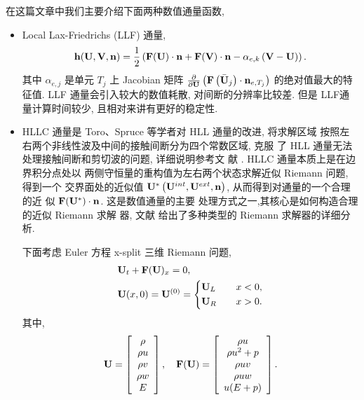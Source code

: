 在这篇文章中我们主要介绍下面两种数值通量函数,
\begin{itemize}
\item Local Lax-Friedrichs (LLF) 通量,
  \begin{equation}
    \label{eq:local-lax-friedrichs-flux}
    {\bf{h}}({\bf{U}},{\bf{V}},{\bf{n}}) = \frac{1}{2}
    \left(
      {\bf{F}}({\bf{U}}) \cdot {\bf{n}} + {\bf{F}}({\bf{V}})
      \cdot {\bf{n}} - \alpha_{e,k} \left( {\bf{V}} - {\bf{U}} \right)
    \right).
  \end{equation}
  其中 $\alpha_{e,j}$ 是单元 $T_{j}$ 上 Jacobian 矩阵 $\frac{\partial}{\partial
    {\bf{U}}} \left( {\bf{F}}\left( \bar{{\bf{U}}}_{j}
    \right)\cdot {\bf{n}}_{e,T_{j}} \right)$ 的绝对值最大的特征值.
  LLF 通量会引入较大的数值耗散, 对间断的分辨率比较差. 但是 LLF通
  量计算时间较少, 且相对来讲有更好的稳定性.
\item HLLC 通量是 Toro、Spruce 等学者对 HLL 通量的改进, 将求解区域
  按照左右两个非线性波及中间的接触间断分为四个常数区域, 克服
  了 HLL 通量无法处理接触间断和剪切波的问题, 详细说明参考文
  献 \cite{Toro1994,Harten1983b}. HLLC 通量本质上是在边界积分点处以
  两侧守恒量的重构值为左右两个状态求解近似 Riemann 问题, 得到一个
  交界面处的近似值 ${\bf{U}}^{*}\left( {\bf{U}}^{int},
    {\bf{U}}^{ext},{\bf{n}} \right)$, 从而得到对通量的一个合理的近
  似 ${\bf{F}}({\bf{U}}^{*})\cdot {\bf{n}}$. 这是数值通量的主要
  处理方式之一,其核心是如何构造合理的近似 Riemann 求解
  器, 文献 \cite{Toro2009} 给出了多种类型的 Riemann 求解器的详细分
  析.

  下面考虑 Euler 方程 x-split 三维 Riemann 问题,
  \begin{equation}
    \label{eq:x-split-3d-Riemann}
    \begin{aligned}
      &{\bf{U}}_{t}+{\bf{F}}({\bf{U}})_{x} = 0,\\
      &{\bf{U}}(x,0) = {\bf{U}}^{(0)} = \left\{
        \begin{aligned}
          &{\bf{U}}_{L} \quad & x < 0,\\
          &{\bf{U}}_{R} \quad & x > 0.
        \end{aligned}
      \right.
    \end{aligned}
  \end{equation}
  其中,
  \begin{equation}
    \label{eq:x-split-3d-Riemann-variable-and-flux}
    {\bf{U}} = \left[
      \begin{array}{c}
        \rho\\
        \rho u\\
        \rho v\\
        \rho w\\
        E
      \end{array}
    \right], \quad {\bf{F}}({\bf{U}}) = \left[
      \begin{array}{c}
        \rho u\\
        \rho u^{2} + p\\
        \rho u v\\
        \rho u w\\
        u (E + p)
      \end{array}
    \right].
  \end{equation}


\end{itemize}
